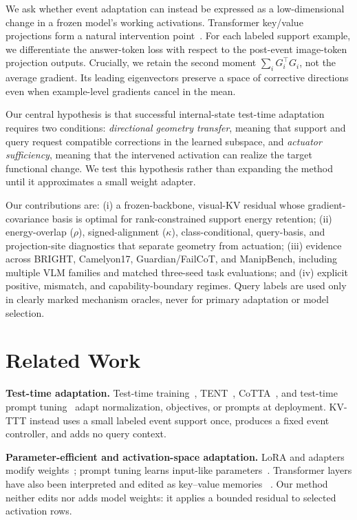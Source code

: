 \documentclass[conference]{IEEEtran}
\newcommand{\KVTTT}{\textsc{KV-TTT}}
\begin{document}
We ask whether event adaptation can instead be expressed as a low-dimensional
change in a frozen model's working activations. Transformer key/value projections
form a natural intervention point~\cite{vaswani2017attention,geva2021kv}. For
each labeled support example, we differentiate the answer-token loss with
respect to the post-event image-token projection outputs. Crucially, we retain
the second moment $\sum_iG_i^\top G_i$, not the average gradient. Its leading
eigenvectors preserve a space of corrective directions even when example-level
gradients cancel in the mean.

Our central hypothesis is that successful internal-state test-time adaptation
requires two conditions: \emph{directional geometry transfer}, meaning that
support and query request compatible corrections in the learned subspace, and
\emph{actuator sufficiency}, meaning that the intervened activation can realize
the target functional change.  We test this hypothesis rather than expanding
the method until it approximates a small weight adapter.

Our contributions are: (i) a frozen-backbone, visual-KV residual whose
gradient-covariance basis is optimal for rank-constrained support energy
retention; (ii) energy-overlap ($\rho$), signed-alignment ($\kappa$),
class-conditional, query-basis, and projection-site diagnostics that separate
geometry from actuation; (iii) evidence across \textsc{BRIGHT}, Camelyon17,
Guardian/FailCoT, and ManipBench, including multiple VLM families and matched
three-seed task evaluations; and (iv) explicit positive, mismatch, and
capability-boundary regimes.  Query labels are used only in clearly marked
mechanism oracles, never for primary adaptation or model selection.

\section{Related Work}
\textbf{Test-time adaptation.} Test-time training~\cite{sun2020ttt},
TENT~\cite{wang2020tent}, CoTTA~\cite{wang2022cotta}, and test-time prompt
tuning~\cite{shu2022tpt} adapt normalization, objectives, or prompts at
deployment. \KVTTT{} instead uses a small labeled event support once, produces a
fixed event controller, and adds no query context.

\textbf{Parameter-efficient and activation-space adaptation.} LoRA and
adapters modify weights~\cite{hu2021lora,houlsby2019adapters}; prompt tuning
learns input-like parameters~\cite{lester2021prompt}. Transformer layers have
also been interpreted and edited as key--value memories
~\cite{geva2021kv,meng2022rome,meng2023memit}. Our method neither edits nor
adds model weights: it applies a bounded residual to selected activation rows.
\end{document}
